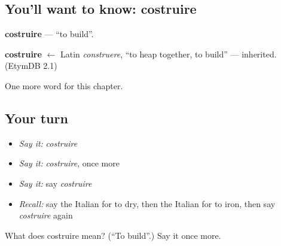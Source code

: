 \subsection*{You'll want to know: costruire}
\textbf{costruire} — \textquotedblleft{}to build\textquotedblright{}.

\begin{cousinweb}
\textbf{costruire} $\leftarrow$ Latin \emph{construere}, \textquotedblleft{}to heap together, to build\textquotedblright{} — inherited. (EtymDB 2.1)
\end{cousinweb}

\begin{grammarlens}[title={What you've built}]
One more word for this chapter.
\end{grammarlens}

\subsection*{Your turn}
\begin{itemize}
\raggedright
  \item \emph{Say it:} \emph{costruire}
  \item \emph{Say it:} \emph{costruire}, once more
  \item \emph{Say it:} say \emph{costruire}
  \item \emph{Recall:} say the Italian for to dry, then the Italian for to iron, then say \emph{costruire} again
\end{itemize}

\begin{tcolorbox}[breakable,colback=teal!4,colframe=teal!35!black,title={Before you move on}]
What does costruire mean? (\textquotedblleft{}To build\textquotedblright{}.) Say it once more.
\end{tcolorbox}
